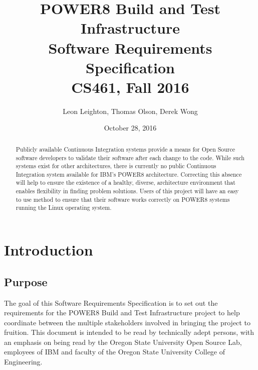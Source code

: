\documentclass[10pt,letterpaper,onecolumn,draftclsnofoot]{IEEEtran}
\begin{document}
\begin{titlepage}
  \title{POWER8 Build and Test Infrastructure\\Software Requirements Specification\\CS461, Fall 2016}
  \author{Leon Leighton, Thomas Olson, Derek Wong}
  \date{October 28, 2016}
  \maketitle
  \begin{abstract}
  \noindent Publicly available Continuous Integration systems provide a means for Open Source software developers to validate their software after each change to the code.
  While such systems exist for other architectures, there is currently no public Continuous Integration system available for IBM's POWER8 architecture. 
  Correcting this absence will help to ensure the existence of a healthy, diverse, architecture environment that enables flexibility in finding problem solutions. 
  Users of this project will have an easy to use method to ensure that their software works correctly on POWER8 systems running the Linux operating system.
  \end{abstract}
\end{titlepage}

\section{Introduction}
\subsection{Purpose}
The goal of this Software Requirements Specification is to set out the requirements for the POWER8 Build and Test Infrastructure project to help coordinate between the multiple stakeholders involved in bringing the project to fruition. This document is intended to be read by technically adept persons, with an emphasis on being read by the Oregon State University Open Source Lab, employees of IBM and faculty of the Oregon State University College of Engineering.
\end{document}
